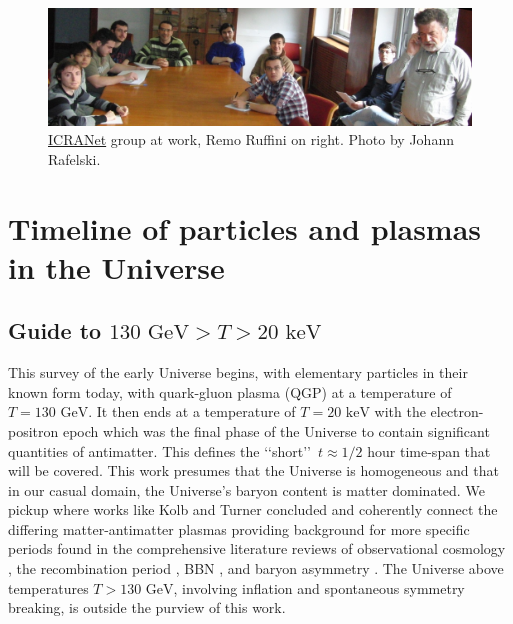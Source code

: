 \documentclass[universe,article,submit,moreauthors,pdftex,a4paper]{Definitions/mdpi}
\newcommand{\GeV}{\text{ GeV}}
\newcommand{\keV}{\text{ keV}}
\begin{document}

\begin{figure}[H]
  \centering  \includegraphics[width=\textwidth]{./plots/12MarchRemoAtWorkC.jpg}
  \caption{\href{https://www.icranet.org/}{ICRANet} group at work, Remo Ruffini on right. Photo by Johann Rafelski. \label{RemoAtWork}}
\end{figure}

\tableofcontents

\section{Timeline of particles and plasmas in the Universe}\label{sec:Intro}
\subsection{Guide to $130\GeV>T>20\keV$}\label{sec:Guide}
\noindent This survey of the early Universe begins, with elementary particles in their known form today, with quark-gluon plasma (QGP) at a temperature of $T=130\GeV$. It then ends at a temperature of $T=20\keV$ with the electron-positron epoch which was the final phase of the Universe to contain significant quantities of antimatter. This defines the \lq\lq short\rq\rq\ $t\approx1/2$ hour time-span that will be covered. This work presumes that the Universe is homogeneous and that in our casual domain, the Universe's baryon content is matter dominated. We pickup where works like Kolb and Turner \cite{kolb1981early} concluded and coherently connect the differing matter-antimatter plasmas providing background for more specific periods found in the comprehensive literature reviews of observational cosmology \cite{Davis:1985rj,Springel:2005nw,Arbey:2021gdg}, the recombination period \cite{Planck:2018vyg,Planck:2018nkj}, BBN \cite{Steigman:2007xt,Cyburt:2015mya,Pitrou:2018cgg}, and baryon asymmetry \cite{Canetti:2012zc,ParticleDataGroup:2022pth}. The Universe above temperatures $T>130 \GeV$, involving inflation \cite{Baumann:2009ds,Allahverdi:2020bys} and spontaneous symmetry breaking, is outside the purview of this work.
\end{document}
